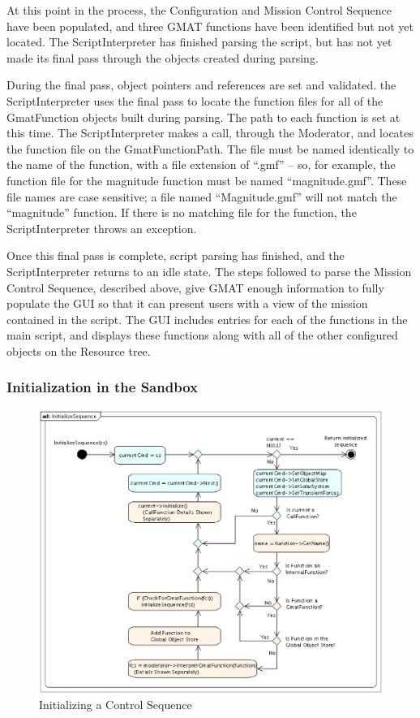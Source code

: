 At this point in the process, the Configuration and Mission Control Sequence have been populated,
and three GMAT functions have been identified but not yet located.  The ScriptInterpreter has
finished parsing the script, but has not yet made its final pass through the objects created during
parsing.

During the final pass, object pointers and references are set and validated.  the ScriptInterpreter
uses the final pass to locate the function files for all of the  GmatFunction objects built during
parsing.  The path to each function is set at this time.  The ScriptInterpreter makes a call,
through the Moderator, and locates the function file on the GmatFunctionPath.  The file must be
named identically to the name of the function, with a file extension of ``.gmf'' -- so, for example,
the function file for the magnitude function must be named  ``magnitude.gmf''.  These file names
are case sensitive; a file named ``Magnitude.gmf'' will not match the ``magnitude'' function.  If
there is no matching file for the function, the ScriptInterpreter throws an exception.

Once this final pass is complete, script parsing has finished, and the ScriptInterpreter returns to
an idle state.  The steps followed to parse the Mission Control Sequence, described above, give GMAT
enough information to fully populate the GUI so that it can present users with a view of the mission
contained in the script.  The GUI includes entries for each of the functions in the main script,
and displays these functions along with all of the other configured objects on the Resource tree.

\subsubsection{Initialization in the Sandbox}

\begin{figure}
\begin{center}
\includegraphics[scale=0.5]{Images/InitializeSequence.eps}
\caption{\label{figure:InitializeControlFunctionChapter}Initializing a Control Sequence}
\end{center}
\end{figure}


